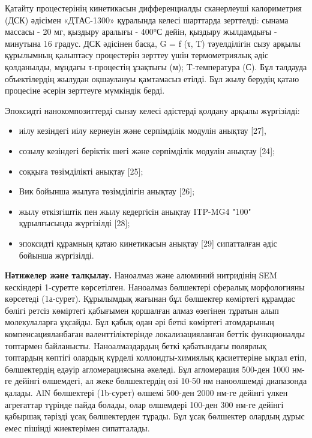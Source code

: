Қатайту процестерінің кинетикасын дифференциалды сканерлеуші
калориметрия (ДСК) әдісімен «ДТАС-1300» құралында келесі шарттарда
зерттелді: сынама массасы - 20 мг, қыздыру аралығы - 400°С дейін,
қыздыру жылдамдығы - минутына 16 градус. ДСК әдісінен басқа, G = f (τ,
T) тәуелділігін сызу арқылы құрылымның қалыптасу процестерін зерттеу
үшін термометриялық әдіс қолданылды, мұндағы τ-процестің ұзақтығы (м);
T-температура (С). Бұл талдауда объектілердің жылудан оқшаулануы
қамтамасыз етілді. Бұл жылу берудің қатаю процесіне әсерін зерттеуге
мүмкіндік берді.

Эпоксидті нанокомпозиттерді сынау келесі әдістерді қолдану арқылы
жүргізілді:

\begin{itemize}
\item
  иілу кезіндегі иілу кернеуін және серпімділік модулін анықтау
  {[}27{]},
\item
  созылу кезіндегі беріктік шегі және серпімділік модулін анықтау
  {[}24{]};
\item
  соққыға төзімділікті анықтау {[}25{]};
\item
  Вик бойынша жылуға төзімділігін анықтау {[}26{]};
\item
  жылу өткізгіштік пен жылу кедергісін анықтау ITP-MG4 "100"
  құрылғысында жүргізілді {[}28{]};
\item
  эпоксидті құрамның қатаю кинетикасын анықтау {[}29{]} сипатталған әдіс
  бойынша жүргізілді.
\end{itemize}

{\bfseries Нәтижелер және талқылау.} Наноалмаз және алюминий нитридінің SEM
кескіндері 1-суретте көрсетілген. Наноалмаз бөлшектері сфералық
морфологияны көрсетеді (1а-сурет). Құрылымдық жағынан бұл бөлшектер
көміртегі құрамдас бөлігі ретсіз көміртегі қабығымен қоршалған алмаз
өзегінен тұратын алып молекулаларға ұқсайды. Бұл қабық одан әрі беткі
көміртегі атомдарының компенсацияланбаған валенттіліктерінде
локализацияланған беттік функционалды топтармен байланысты.
Наноалмаздардың беткі қабатындағы полярлық топтардың көптігі олардың
күрделі коллоидты-химиялық қасиеттеріне ықпал етіп, бөлшектердің едәуір
агломерациясына әкеледі. Бұл агломерация 500-ден 1000 нм-ге дейінгі
өлшемдегі, ал жеке бөлшектердің өзі 10-50 нм наноөлшемді диапазонда
қалады. AlN бөлшектері (1b-сурет) өлшемі 500-ден 2000 нм-ге дейінгі
үлкен агрегаттар түрінде пайда болады, олар өлшемдері 100-ден 300 нм-ге
дейінгі қабыршақ тәрізді ұсақ бөлшектерден тұрады. Бұл ұсақ бөлшектер
олардың дұрыс емес пішінді жиектерімен сипатталады.

